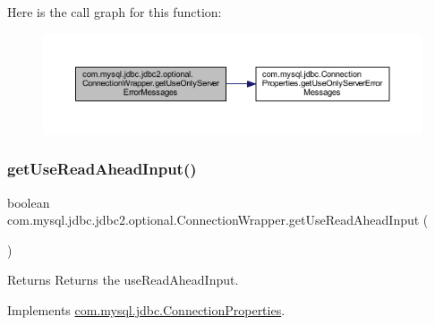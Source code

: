Here is the call graph for this function\+:
\nopagebreak
\begin{figure}[H]
\begin{center}
\leavevmode
\includegraphics[width=350pt]{classcom_1_1mysql_1_1jdbc_1_1jdbc2_1_1optional_1_1_connection_wrapper_a0d102be23b8a849c3ffbc2412ee20615_cgraph}
\end{center}
\end{figure}
\mbox{\label{classcom_1_1mysql_1_1jdbc_1_1jdbc2_1_1optional_1_1_connection_wrapper_a4fa0114adf1b3a739082aafb7e016d47}} 
\subsubsection{\texorpdfstring{get\+Use\+Read\+Ahead\+Input()}{getUseReadAheadInput()}}
{\footnotesize\ttfamily boolean com.\+mysql.\+jdbc.\+jdbc2.\+optional.\+Connection\+Wrapper.\+get\+Use\+Read\+Ahead\+Input (\begin{DoxyParamCaption}{ }\end{DoxyParamCaption})}

\begin{DoxyReturn}{Returns}
Returns the use\+Read\+Ahead\+Input. 
\end{DoxyReturn}


Implements \mbox{\hyperlink{interfacecom_1_1mysql_1_1jdbc_1_1_connection_properties_abad9605452003baa9e6841a990334c92}{com.\+mysql.\+jdbc.\+Connection\+Properties}}.

